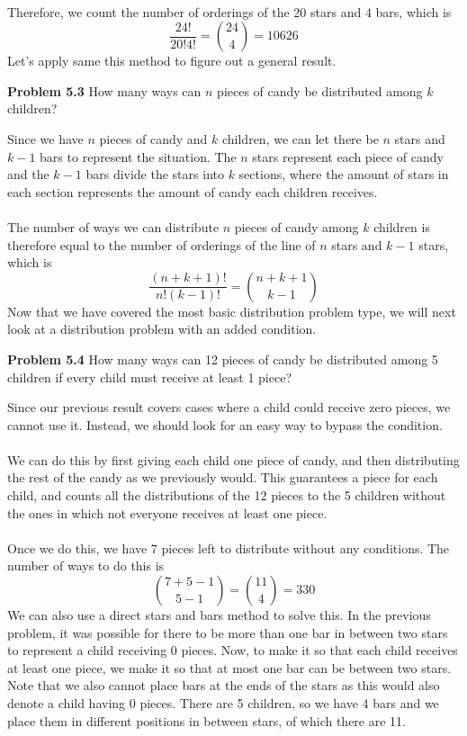 \documentclass[11pt]{scrartcl}
\begin{document}
\\
\noindent 
Therefore, we count the number of orderings of the 20 stars and 4 bars, which is 
$$\frac{24!}{20!4!}={24 \choose 4}=10626$$
Let's apply same this method to figure out a general result. 
\\
\begin{tcolorbox}
\textbf{Problem 5.3} How many ways can $n$ pieces of candy be distributed among $k$ children? 
\end{tcolorbox}
\noindent 
Since we have $n$ pieces of candy and $k$ children, we can let there be $n$ stars and $k-1$ bars to represent the situation. The $n$ stars represent each piece of candy and the $k-1$ bars divide the stars into $k$ sections, where the amount of stars in each section represents the amount of candy each children receives. \\
\\
\noindent 
The number of ways we can distribute $n$ pieces of candy among $k$ children is therefore equal to the number of orderings of the line of $n$ stars and $k-1$ stars, which is 
$$\frac{(n+k+1)!}{n!(k-1)!}={{n+k+1} \choose {k-1}}$$
Now that we have covered the most basic distribution problem type, we will next look at a distribution problem with an added condition. 
\\
\begin{tcolorbox}
\textbf{Problem 5.4} How many ways can 12 pieces of candy be distributed among 5 children if every child must receive at least 1 piece?
\end{tcolorbox}
\noindent
Since our previous result covers cases where a child could receive zero pieces, we cannot use it. Instead, we should look for an easy way to bypass the condition. \\
\\
\noindent 
We can do this by first giving each child one piece of candy, and then distributing the rest of the candy as we previously would. This guarantees a piece for each child, and counts all the distributions of the 12 pieces to the 5 children without the ones in which not everyone receives at least one piece. \\
\\
\noindent 
Once we do this, we have 7 pieces left to distribute without any conditions. The number of ways to do this is
$${{{7+5-1} \choose {5-1}}={11 \choose 4}=330}$$
We can also use a direct stars and bars method to solve this. In the previous problem, it was possible for there to be more than one bar in between two stars to represent a child receiving 0 pieces. Now, to make it so that each child receives at least one piece, we make it so that at most one bar can be between two stars. Note that we also cannot place bars at the ends of the stars as this would also denote a child having 0 pieces. There are 5 children, so we have 4 bars and we place them in different positions in between stars, of which there are 11.  \\
\end{document}
